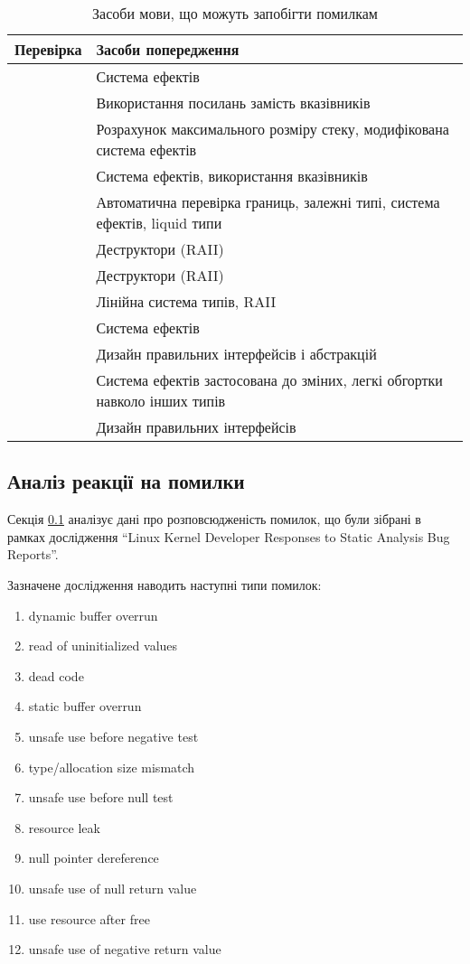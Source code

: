 \documentclass[main.tex]{subfiles}
\begin{document}
\begin{table}
  \tabulinesep=1mm
  \caption{Засоби мови, що можуть запобігти помилкам}
  \begin{tabu}{|c|X[l]|}
    \hline
    Перевірка & Засоби попередження \\
    \hline
     & Система ефектів \\
     & Використання посилань замість вказівників \\
     & Розрахунок максимального розміру стеку, модифікована система ефектів \\
    \hline
     & Система ефектів, використання вказівників \\
     & Автоматична перевірка границь, залежні типі, система ефектів, liquid типи \\
     & Деструктори (RAII) \\
     & Деструктори (RAII) \\
     & Лінійна система типів, RAII \\
    \hline
     & Система ефектів \\
     & Дизайн правильних інтерфейсів і абстракцій \\
     & Система ефектів застосована до зміних, легкі обгортки навколо інших типів \\
     & Дизайн правильних інтерфейсів \\
    \hline
  \end{tabu}
  \label{linux-errors-mitigation}
\end{table}

\FloatBarrier
\subsection{Аналіз реакції на помилки}\label{linux-kernel-developer-responses-section}
Секція \ref{linux-kernel-developer-responses-section} аналізує дані про розповсюдженість помилок, що були зібрані в рамках дослідження ``Linux Kernel Developer Responses to Static Analysis Bug Reports''\cite{linux-kernel-developer-responses}.

Зазначене дослідження наводить наступні типи помилок:
\begin{enumerate}[nosep]
\item dynamic buffer overrun
\item read of uninitialized values
\item dead code
\item static buffer overrun
\item unsafe use before negative test
\item type/allocation size mismatch
\item unsafe use before null test
\item resource leak
\item null pointer dereference
\item unsafe use of null return value
\item use resource after free
\item unsafe use of negative return value
\end{enumerate}
\end{document}
